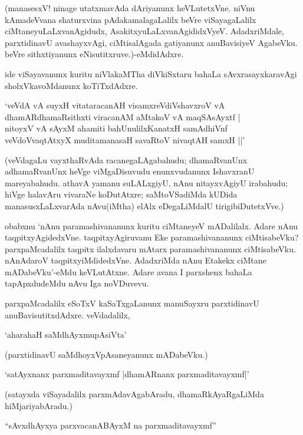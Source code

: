 (manasesxV! ninage utatxmavAda dAriyanunx heVLutetxVne. niVnu kAmadeVvana shaturxvina pAdakamalagaLalilx beVre viSayagaLalilx ciMtaneyuLaLxvanAgidudx, AsakitxyuLaLxvanAgididxVyeV. AdadxriMdale, parxtidinavU avashayxvAgi, ciMtisalAgada gatiyanunx anuBavisiyeV AgabeVku. beVre sithxtiyanunx eNisutitxruve.)-eMdidAdxre.

ide viSayavanunx kuritu niVlakaMTha diVkiSxtaru bahaLa sAvxrasayxkaravAgi sholxVkavoMdanunx koTiTxdAdxre.

\begin{shloka}
`veVdA vA suyxH vitataracanAH visamxreVdiVshavxroV vA\\
dhamARdhamaRsithxti viracanAM aMtakoV vA maqSAsAyxtf |\\
nitoyxV vA sAyxM ahamiti bahUnulilxKanatxH samAdhiVnf\\
veVdoVvaqtAtxyX muditamanasaH savaRtoV nivaqtAH samxH ||'
\end{shloka}

(veVdagaLu vayxthaRvAda racanegaLAgabahudu; dhamaRvanUnx adhamaRvanUnx heVge viMgaDisuvudu enunxvudanunx IshavxranU mareyabahudu. athavA yamanu suLALxgiyU, nAnu nitayxvAgiyU irabahudu; hiVge halavAru vivaraNe koDutAtxre; saMtoVSadiMda kUDida manasusxLaLxvarAda nAvu(iMtha) elAlx eDegaLiMdalU tirigibiDutetxVve.)

obabxnu `nAnu paramashivananunx kuritu ciMtaneyeV mADalilalx. Adare nAnu taqpitxyAgidedxVne. taqpitxyAgiruvanu Eke paramashivananunx ciMtisabeVku? parxpaMcadalilx taqpitx ilalxdavaru mAtarx paramashivananunx ciMtisabeVku. nAnAdaroV taqpitxyiMdidedxVne. AdadxriMda nAnu Etakekx ciMtane mADabeVku'-eMdu keVLutAtxne. Adare avana I parxshenx bahaLa tapApxdudeMdu nAvu Iga noVDuvevu.

parxpaMcadalilx eSoTxV kaSaTxgaLanunx manuSayxru parxtidinavU anuBavisutitxdAdxre. veVdadalilx,

\begin{shloka}
`aharahaH saMdhAyxmupAsiVta'
\end{shloka}

(parxtidinavU saMdhoyxVpAsaneyanunx mADabeVku.)

\begin{shloka}
`satAyxnanx parxmaditavayxmf |dhamARnanx parxmaditavayxmf|'
\end{shloka}

(satayxda viSayadalilx parxmAdavAgabAradu, dhamaRkAyaRgaLiMda hiMjariyabAradu.)

\begin{shloka}
``sAvxdhAyxya parxvacanABAyxM na parxmaditavayxmf''
\end{shloka}


